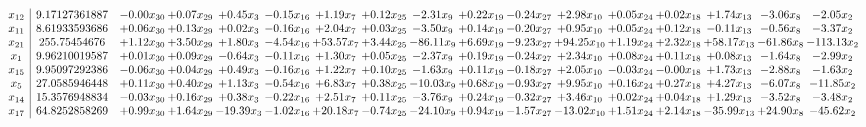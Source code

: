 \documentclass[9pt]{article}
\begin{document}
 \[\begin{array}{c| c c@{\hskip 2pt} c@{\hskip 2pt} c@{\hskip 2pt} c@{\hskip 2pt} c@{\hskip 2pt} c@{\hskip 2pt} c@{\hskip 2pt} c@{\hskip 2pt} c@{\hskip 2pt} c@{\hskip 2pt} c@{\hskip 2pt} c@{\hskip 2pt} c@{\hskip 2pt} c@{\hskip 2pt} c@{\hskip 2pt} }
 x_{12}   &  9.17127361887 & -0.00 x_{30} & +  0.07 x_{29} & +  0.45 x_{3} & -0.15 x_{16} & +  1.19 x_{7} & +  0.12 x_{25} & -2.31 x_{9} & +  0.22 x_{19} & -0.24 x_{27} & +  2.98 x_{10} & +  0.05 x_{24} & +  0.02 x_{18} & +  1.74 x_{13} & -3.06 x_{8} & -2.05 x_{2}\\
 x_{11}   &  8.61933593686 & +  0.06 x_{30} & +  0.13 x_{29} & +  0.02 x_{3} & -0.16 x_{16} & +  2.04 x_{7} & +  0.03 x_{25} & -3.50 x_{9} & +  0.14 x_{19} & -0.20 x_{27} & +  0.95 x_{10} & +  0.05 x_{24} & +  0.12 x_{18} & -0.11 x_{13} & -0.56 x_{8} & -3.37 x_{2}\\
 x_{21}   &  255.75454676 & +  1.12 x_{30} & +  3.50 x_{29} & +  1.80 x_{3} & -4.54 x_{16} & + 53.57 x_{7} & +  3.44 x_{25} & -86.11 x_{9} & +  6.69 x_{19} & -9.23 x_{27} & + 94.25 x_{10} & +  1.19 x_{24} & +  2.32 x_{18} & + 58.17 x_{13} & -61.86 x_{8} & -113.13 x_{2}\\
 x_{1}   &  9.96210019587 & +  0.01 x_{30} & +  0.09 x_{29} & -0.64 x_{3} & -0.11 x_{16} & +  1.30 x_{7} & +  0.05 x_{25} & -2.37 x_{9} & +  0.19 x_{19} & -0.24 x_{27} & +  2.34 x_{10} & +  0.08 x_{24} & +  0.11 x_{18} & +  0.08 x_{13} & -1.64 x_{8} & -2.99 x_{2}\\
 x_{15}   &  9.95097292386 & -0.06 x_{30} & +  0.04 x_{29} & +  0.49 x_{3} & -0.16 x_{16} & +  1.22 x_{7} & +  0.10 x_{25} & -1.63 x_{9} & +  0.11 x_{19} & -0.18 x_{27} & +  2.05 x_{10} & -0.03 x_{24} & -0.00 x_{18} & +  1.73 x_{13} & -2.88 x_{8} & -1.63 x_{2}\\
 x_{5}   &  27.0585946448 & +  0.11 x_{30} & +  0.40 x_{29} & +  1.13 x_{3} & -0.54 x_{16} & +  6.83 x_{7} & +  0.38 x_{25} & -10.03 x_{9} & +  0.68 x_{19} & -0.93 x_{27} & +  9.95 x_{10} & +  0.16 x_{24} & +  0.27 x_{18} & +  4.27 x_{13} & -6.07 x_{8} & -11.85 x_{2}\\
 x_{14}   &  15.3576948834 & -0.03 x_{30} & +  0.16 x_{29} & +  0.38 x_{3} & -0.22 x_{16} & +  2.51 x_{7} & +  0.11 x_{25} & -3.76 x_{9} & +  0.24 x_{19} & -0.32 x_{27} & +  3.46 x_{10} & +  0.02 x_{24} & +  0.04 x_{18} & +  1.29 x_{13} & -3.52 x_{8} & -3.48 x_{2}\\
 x_{17}   &  64.8252858269 & +  0.99 x_{30} & +  1.64 x_{29} & -19.39 x_{3} & -1.02 x_{16} & + 20.18 x_{7} & -0.74 x_{25} & -24.10 x_{9} & +  0.94 x_{19} & -1.57 x_{27} & -13.02 x_{10} & +  1.51 x_{24} & +  2.14 x_{18} & -35.99 x_{13} & + 24.90 x_{8} & -45.62 x_{2}\\

\end{array}\]
\end{document}
